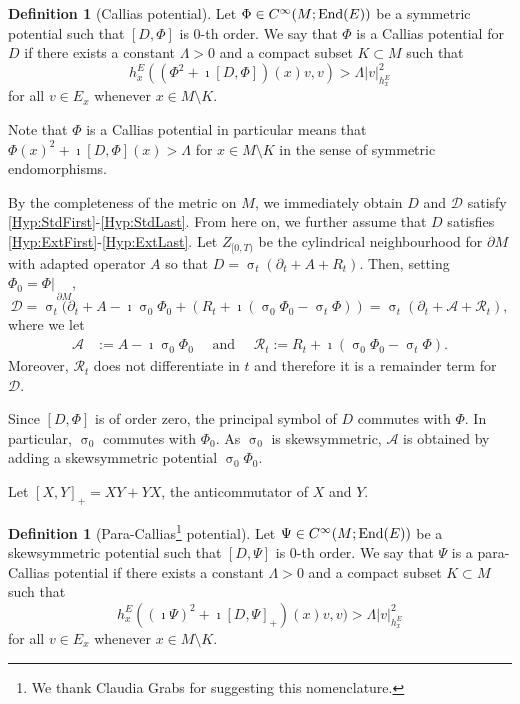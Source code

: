 \documentclass[a4paper,10pt,reqno]{amsart}
\newcommand{\sym}{\upsigma}
\newcommand{\rest}[1]{{{\lvert_{}}_{}}_{#1}}
\newcommand{\modulus}[1]{|#1|}
\newcommand{\Ck}[2][{}]{{\rm C}^{#2}_{\rm #1}}%
\DeclareMathOperator{\End}{End} %
\newcommand{\DDD}{\mathscr{D}}%
\newcommand{\AAA}{\mathscr{A}}%
\newcommand{\RRR}{\mathscr{R}}%
\newcommand{\dM}{\partial M}
\theoremstyle{definition}
\newtheorem{definition}[theorem]{Definition}
\begin{document}
\begin{definition}[Callias potential]
Let $\Phi \in \Ck{\infty}(M;\End(E))$ be a symmetric potential such that $[D,\Phi]$ is $0$-th order.
We say that $\Phi$  is a Callias potential for $D$ if there exists a constant $\Lambda > 0$ and a compact subset $K \subset M$ such that 
$$ 
h^E_x( (\Phi^2 + \imath[D,\Phi])(x) v,v) > \Lambda \modulus{v}_{h^E_x}^2
$$
for all $v \in E_x$ whenever $x \in M \setminus K$.
\end{definition}

Note that $\Phi$ is a Callias potential in particular means that $\Phi(x)^2 + \imath[D,\Phi](x) > \Lambda$ for $x \in M \setminus K$ in the sense of symmetric endomorphisms.

By the completeness of the metric on $M$, we immediately obtain $D$ and $\DDD$ satisfy \ref{Hyp:StdFirst}-\ref{Hyp:StdLast}.
From here on, we further assume that $D$ satisfies \ref{Hyp:ExtFirst}-\ref{Hyp:ExtLast}. 
Let $Z_{[0,T)}$ be the  cylindrical neighbourhood for $\dM$ with adapted operator $A$ so that $D = \sym_t(\partial_t + A + R_t)$.
Then, setting $\Phi_0 = \Phi\rest{\dM}$, 
$$\DDD = \sym_t(\partial_t + A - \imath \sym_0 \Phi_0 + (R_t  + \imath(\sym_0 \Phi_0 - \sym_t \Phi)) = \sym_t(\partial_t + \AAA + \RRR_t),$$
where we let 
\begin{align*}
\AAA &:= A - \imath \sym_0 \Phi_0 \quad\text{ and }\quad
\RRR_t :=  R_t  + \imath(\sym_0 \Phi_0 - \sym_t \Phi).
\end{align*}
Moreover, $\RRR_t$ does not differentiate in $t$ and therefore it is a remainder term for $\DDD$.

Since $[D,\Phi]$ is of order zero, the principal symbol of $D$ commutes with $\Phi$.
In particular, $\sym_0$ commutes with $\Phi_0$.
As $\sym_0$ is skewsymmetric, $\AAA$ is obtained by adding a skewsymmetric potential $\sym_0 \Phi_0$. 

Let $[X,Y]_+ = XY + YX$, the anticommutator of $X$ and $Y$. 
\begin{definition}[Para-Callias\footnote{We thank Claudia Grabs for suggesting this nomenclature.} potential] 
Let $\Psi \in \Ck{\infty}(M;\End(E))$ be a skewsymmetric potential such that $[D,\Psi]$ is $0$-th order. 
We say that $\Psi$ is a para-Callias potential if there exists a constant $\Lambda > 0$ and a compact subset $K \subset M$ such that 
$$ 
h^E_x( (\imath\Psi)^2 + \imath[D,\Psi]_+)(x) v,v) > \Lambda \modulus{v}_{h^E_x}^2
$$
for all $v \in E_x$ whenever $x \in M \setminus K$.
\end{definition} 
\end{document}
